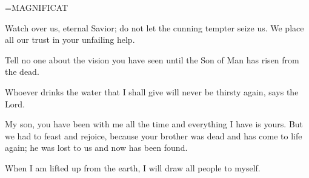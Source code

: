 \hangindent=\parindent \small MAGNIFICAT
\begin{description}[labelindent=\parindent, noitemsep, leftmargin=*]
\item [Week 1:] 	Watch over us, eternal Savior; do not let the cunning tempter seize us. We place all our trust in your unfailing help.
\item [Week 2:] 	Tell no one about the vision you have seen until the Son of Man has risen from the dead.
\item [Week 3:] 	Whoever drinks the water that I shall give will never be thirsty again, says the Lord.
\item [Week 4:] 	My son, you have been with me all the time and everything I have is yours. But we had to feast and rejoice, because your brother was dead and has come to life again; he was lost to us and now has been found.
\item [Week 5:] 	When I am lifted up from the earth, I will draw all people to myself.
\end{description}
